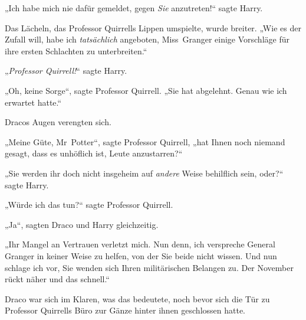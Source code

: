 „Ich habe mich nie dafür gemeldet, gegen \emph{Sie} anzutreten!“ sagte Harry.

Das Lächeln, das Professor Quirrells Lippen umspielte, wurde breiter. „Wie es der Zufall will, habe ich \emph{tatsächlich} angeboten, Miss~Granger einige Vorschläge für ihre ersten Schlachten zu unterbreiten.“

„\emph{Professor Quirrell!}“ sagte Harry.

„Oh, keine Sorge“, sagte Professor Quirrell. „Sie hat abgelehnt. Genau wie ich erwartet hatte.“

Dracos Augen verengten sich.

„Meine Güte, Mr~Potter“, sagte Professor Quirrell, „hat Ihnen noch niemand gesagt, dass es unhöflich ist, Leute anzustarren?“

„Sie werden ihr doch nicht insgeheim auf \emph{andere} Weise behilflich sein, oder?“ sagte Harry.

„Würde ich das tun?“ sagte Professor Quirrell.

„Ja“, sagten Draco und Harry gleichzeitig.

„Ihr Mangel an Vertrauen verletzt mich. Nun denn, ich verspreche General Granger in keiner Weise zu helfen, von der Sie beide nicht wissen. Und nun schlage ich vor, Sie wenden sich Ihren militärischen Belangen zu. Der November rückt näher und das schnell.“

\later

Draco war sich im Klaren, was das bedeutete, noch bevor sich die Tür zu Professor Quirrells Büro zur Gänze hinter ihnen geschlossen hatte.

